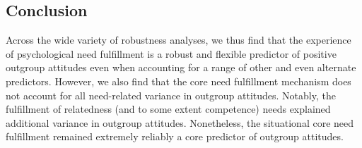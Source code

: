 \documentclass[man, 12pt, a4paper, mask]{apa7}
\theoremstyle{break}
\theoremstyle{plain}
\begin{document}


\subsection{Conclusion}
Across the wide variety of robustness analyses, we thus find that the experience of psychological need fulfillment is a robust and flexible predictor of positive outgroup attitudes even when accounting for a range of other and even alternate predictors. However, we also find that the core need fulfillment mechanism does not account for all need-related variance in outgroup attitudes. Notably, the fulfillment of relatedness (and to some extent competence) needs explained additional variance in outgroup attitudes. Nonetheless, the situational core need fulfillment remained extremely reliably a core predictor of outgroup attitudes.



\end{document}
